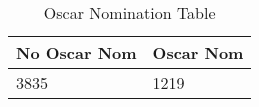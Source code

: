\begin{table}[H]
\centering
\begin{tabular}{ll}
  \hline
No Oscar Nom & Oscar Nom \\ 
  \hline
3835 & 1219 \\ 
   \hline
\end{tabular}
\caption{Oscar Nomination Table} 
\label{tab:on}
\end{table}

